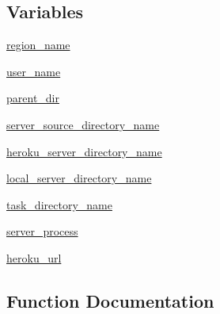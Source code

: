 \subsection*{Variables}
\begin{DoxyCompactItemize}
\item 
\hyperlink{namespaceparlai_1_1mturk_1_1core_1_1dev_1_1server__utils_a1296f9955931a495c136b4e5adc55ef4}{region\+\_\+name}
\item 
\hyperlink{namespaceparlai_1_1mturk_1_1core_1_1dev_1_1server__utils_aa1c891d191a109c1941a85bf62bd4888}{user\+\_\+name}
\item 
\hyperlink{namespaceparlai_1_1mturk_1_1core_1_1dev_1_1server__utils_a432ae14c0d872fbfebe4d9b7d73d13b9}{parent\+\_\+dir}
\item 
\hyperlink{namespaceparlai_1_1mturk_1_1core_1_1dev_1_1server__utils_a46ccde750e304e482adb853bd5c8a852}{server\+\_\+source\+\_\+directory\+\_\+name}
\item 
\hyperlink{namespaceparlai_1_1mturk_1_1core_1_1dev_1_1server__utils_aba21b4850601de4b9921fbf9c5203f92}{heroku\+\_\+server\+\_\+directory\+\_\+name}
\item 
\hyperlink{namespaceparlai_1_1mturk_1_1core_1_1dev_1_1server__utils_a4d18f7fe8131d14e8f0435255b8268a4}{local\+\_\+server\+\_\+directory\+\_\+name}
\item 
\hyperlink{namespaceparlai_1_1mturk_1_1core_1_1dev_1_1server__utils_ae71b53e922b563ae56983df0dd2585e8}{task\+\_\+directory\+\_\+name}
\item 
\hyperlink{namespaceparlai_1_1mturk_1_1core_1_1dev_1_1server__utils_a493aaab7f9dc87be1fc68c9f35bf71fd}{server\+\_\+process}
\item 
\hyperlink{namespaceparlai_1_1mturk_1_1core_1_1dev_1_1server__utils_aff181eda81e07ca80bfee2581a16a016}{heroku\+\_\+url}
\end{DoxyCompactItemize}


\subsection{Function Documentation}
\mbox{\label{namespaceparlai_1_1mturk_1_1core_1_1dev_1_1server__utils_ab2ee72bd56197de749229032b05254da}} 
